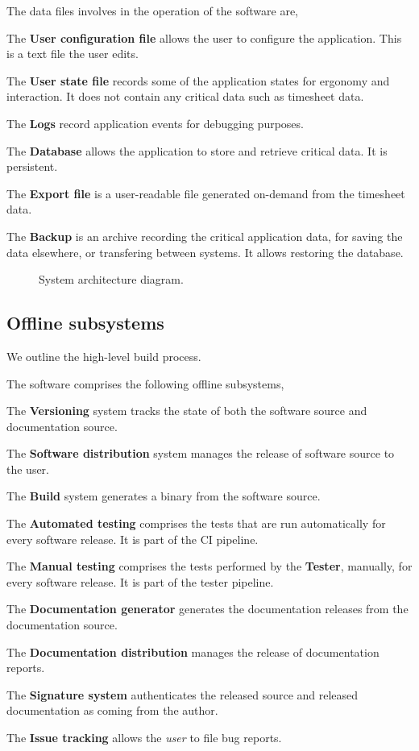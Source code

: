 The data files involves in the operation of the software are,
\begin{compactitem}
\item The \textbf{User configuration file} allows the user to configure the
  application. This is a text file the user edits.
\item The \textbf{User state file} records some of the application states
  for ergonomy and interaction. It does not contain any critical data such
  as timesheet data.
\item The \textbf{Logs} record application events for debugging purposes.
\item The \textbf{Database} allows the application to store and retrieve
  critical data. It is persistent.
\item The \textbf{Export file} is a user-readable file generated on-demand
  from the timesheet data.
\item The \textbf{Backup} is an archive recording the critical application
  data, for saving the data elsewhere, or transfering between systems.
  It allows restoring the database.
\end{compactitem}

\begin{figure}
  
  \caption{\label{fig:arch-diagram} System architecture diagram.}
\end{figure}

\subsection{Offline subsystems}
We outline the high-level build process.

The software comprises the following offline subsystems,
\begin{compactitem}
\item The \textbf{Versioning} system tracks the state of both the software
  source and documentation source.
\item The \textbf{Software distribution} system manages the release of
  software source to the user.
\item The \textbf{Build} system generates a binary from the software source.
\item The \textbf{Automated testing} comprises the tests that are run
  automatically for every software release. It is part of the \gls{CI} pipeline.
\item The \textbf{Manual testing} comprises the tests performed by the
  \textbf{Tester}, manually, for every software release. It is part of the
  tester pipeline.
\item The \textbf{Documentation generator} generates the documentation
  releases from the documentation source.
\item The \textbf{Documentation distribution} manages the release of
  documentation reports.
\item The \textbf{Signature system} authenticates the released source and
  released documentation as coming from the author.
\item The \textbf{Issue tracking} allows the \emph{user} to file bug reports.
\end{compactitem}

